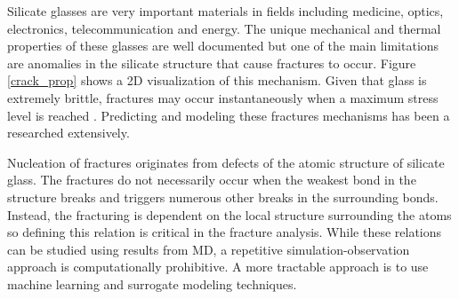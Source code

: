 Silicate glasses are very important materials in fields including medicine, optics, electronics, telecommunication and energy. The unique mechanical and thermal properties of these glasses are well documented but one of the main limitations are anomalies in the silicate structure that cause fractures to occur. Figure \ref{crack_prop} shows a 2D visualization of this mechanism. Given that glass is extremely brittle, fractures may occur instantaneously when a maximum stress level is reached \cite{pedone2015dynamics}. Predicting and modeling these fractures mechanisms has been a researched extensively.

Nucleation of fractures originates from defects of the atomic structure of silicate glass. 
The fractures do not necessarily occur when the weakest bond in the structure breaks and triggers numerous other breaks in the surrounding bonds. Instead, the fracturing is dependent on the local structure surrounding the atoms so defining this relation is critical in the fracture analysis. While these relations can be studied using results from MD, a repetitive simulation-observation approach is computationally prohibitive. A more tractable approach is to use machine learning and surrogate modeling techniques.

